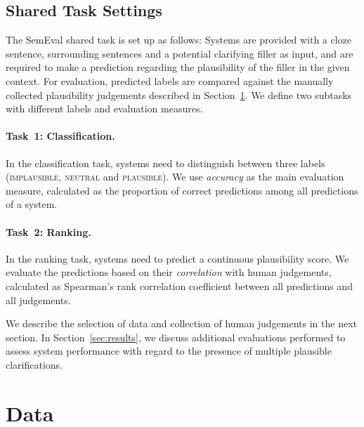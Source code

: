 \documentclass[11pt]{article}
\begin{document}
\subsection{Shared Task Settings}
\label{sec:eval}

The SemEval shared task is set up as follows: Systems are provided with a cloze sentence, surrounding sentences and a potential clarifying filler as input, and are required to make a prediction regarding the plausibility of the filler in the given context. For evaluation, predicted labels are compared against the manually collected plausibility judgements described in Section~\ref{sec:data}. We define two subtasks with different labels and evaluation measures.


\paragraph{Task~1: Classification.} In the classification task, systems need to distinguish between three labels (\textsc{implausible}, \textsc{neutral} and \textsc{plausible}). We use \textit{accuracy} as the main evaluation measure, calculated as the proportion of correct predictions among all predictions of a system.

\paragraph{Task~2: Ranking.} In the ranking task, systems need to predict a continuous plausibility score. We evaluate the predictions based on their \textit{correlation} with human judgements, calculated as Spearman's rank correlation coefficient between all predictions and all judgements.

We describe the selection of data and collection of human judgements in the next section. In Section~\ref{sec:results}, we discuss additional evaluations performed to assess system performance with regard to the presence of multiple plausible clarifications.

\section{Data}
\label{sec:data}
\end{document}
